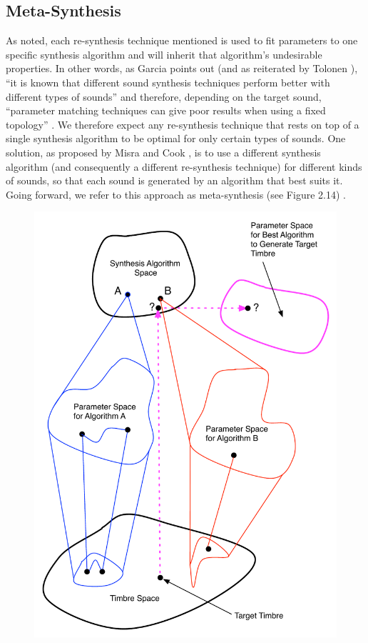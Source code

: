 \documentclass[12pt]{report} 	%
\numberwithin{figure}{chapter}
\numberwithin{table}{chapter}
\numberwithin{equation}{chapter}
\begin{document}
\begin{flushleft}
\section{Meta-Synthesis}

As noted, each re-synthesis technique mentioned is used to fit parameters to one specific synthesis algorithm and will inherit that algorithm's undesirable properties. In other words, as Garcia points out (and as reiterated by Tolonen \cite[p. 103]{Tolonen:1998bh}), ``it is known that different sound synthesis techniques perform better with different types of sounds'' \cite[p. 1]{Garcia:2001jw} and therefore, depending on the target sound, ``parameter matching techniques can give poor results when using a fixed topology'' \cite[p. 1]{Garcia:2000th}. We therefore expect any re-synthesis technique that rests on top of a single synthesis algorithm to be optimal for only certain types of sounds. One solution, as proposed by Misra and Cook \cite{Misra:2009km}, is to use a different synthesis algorithm (and consequently a different re-synthesis technique) for different kinds of sounds, so that each sound is generated by an algorithm that best suits it. Going forward, we refer to this approach as meta-synthesis (see Figure 2.14) \cite[p. 1]{Misra:2009km}. 
\begin{figure}[h!]
\begin{center}
\includegraphics[scale=0.70]{MetaSynthesis1}

\end{center}
\end{figure}
\end{flushleft}
\end{document}
